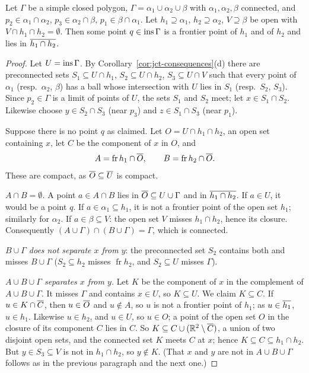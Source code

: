 \begin{lemma}\label{lem:bing-point}
Let $\Gamma$ be a simple closed polygon, $\Gamma=\alpha_1\cup\alpha_2\cup\beta$ with $\alpha_1,\alpha_2,\beta$
connected, and $p_2\in\alpha_1\cap\alpha_2$, $p_3\in\alpha_2\cap\beta$, $p_1\in\beta\cap\alpha_1$. Let
$h_1\supseteq\alpha_1$, $h_2\supseteq\alpha_2$, $V\supseteq\beta$ be open with $V\cap h_1\cap
h_2=\emptyset$. Then some point $q\in\operatorname{ins}\Gamma$ is a frontier point of $h_1$ and of $h_2$ and lies in
$\overline{h_1\cap h_2}$.
\end{lemma}

\begin{proof}
Let $U=\operatorname{ins}\Gamma$. By Corollary~\ref{cor:jct-consequences}(d) there are preconnected sets
$S_1\subseteq U\cap h_1$, $S_2\subseteq U\cap h_2$, $S_3\subseteq U\cap V$ such that every point of
$\alpha_1$ (resp.\ $\alpha_2$, $\beta$) has a ball whose intersection with $U$ lies in $S_1$ (resp.\
$S_2$, $S_3$). Since $p_2\in\Gamma$ is a limit of points of $U$, the sets $S_1$ and $S_2$ meet; let
$x\in S_1\cap S_2$. Likewise choose $y\in S_2\cap S_3$ (near $p_3$) and $z\in S_1\cap S_3$ (near $p_1$).

Suppose there is no point $q$ as claimed. Let $O=U\cap h_1\cap h_2$, an open set containing $x$, let $C$
be the component of $x$ in $O$, and
\[
A=\operatorname{fr}h_1\cap\overline{O},\qquad B=\operatorname{fr}h_2\cap\overline{O}.
\]
These are compact, as $\overline{O}\subseteq\overline{U}$ is compact.

\emph{$A\cap B=\emptyset$.} A point $a\in A\cap B$ lies in $\overline{O}\subseteq U\cup\Gamma$ and in
$\overline{h_1\cap h_2}$. If $a\in U$, it would be a point $q$. If $a\in\alpha_1\subseteq h_1$, it is not a
frontier point of the open set $h_1$; similarly for $\alpha_2$. If $a\in\beta\subseteq V$: the open set
$V$ misses $h_1\cap h_2$, hence its closure. Consequently $(A\cup\Gamma)\cap(B\cup\Gamma)=\Gamma$, which
is connected.

\emph{$B\cup\Gamma$ does not separate $x$ from $y$}: the preconnected set $S_2$ contains both and misses
$B\cup\Gamma$ ($S_2\subseteq h_2$ misses $\operatorname{fr}h_2$, and $S_2\subseteq U$ misses $\Gamma$).

\emph{$A\cup B\cup\Gamma$ separates $x$ from $y$.} Let $K$ be the component of $x$ in the complement of
$A\cup B\cup\Gamma$. It misses $\Gamma$ and contains $x\in U$, so $K\subseteq U$. We claim $K\subseteq
C$. If $u\in K\cap\overline{C}$, then $u\in\overline{O}$ and $u\notin A$, so $u$ is not a frontier point of $h_1$;
as $u\in\overline{h_1}$, $u\in h_1$. Likewise $u\in h_2$, and $u\in U$, so $u\in O$; a point of the open set
$O$ in the closure of its component $C$ lies in $C$. So $K\subseteq C\cup(\mathbb{R}^2\setminus\overline{C})$, a union
of two disjoint open sets, and the connected set $K$ meets $C$ at $x$; hence $K\subseteq C\subseteq
h_1\cap h_2$. But $y\in S_3\subseteq V$ is not in $h_1\cap h_2$, so $y\notin K$. (That $x$ and $y$ are
not in $A\cup B\cup\Gamma$ follows as in the previous paragraph and the next one.)


\end{proof}
